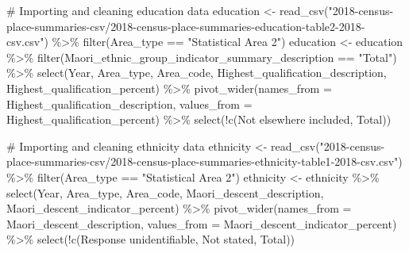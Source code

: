 \documentclass[
  letterpaper,
  DIV=11,
  numbers=noendperiod,
  oneside]{scrartcl}
\newenvironment{Shaded}{\begin{snugshade}}{\end{snugshade}}
\newcommand{\AttributeTok}[1]{\textcolor[rgb]{0.40,0.45,0.13}{#1}}
\newcommand{\CommentTok}[1]{\textcolor[rgb]{0.37,0.37,0.37}{#1}}
\newcommand{\FunctionTok}[1]{\textcolor[rgb]{0.28,0.35,0.67}{#1}}
\newcommand{\NormalTok}[1]{\textcolor[rgb]{0.00,0.23,0.31}{#1}}
\newcommand{\OtherTok}[1]{\textcolor[rgb]{0.00,0.23,0.31}{#1}}
\newcommand{\SpecialCharTok}[1]{\textcolor[rgb]{0.37,0.37,0.37}{#1}}
\newcommand{\StringTok}[1]{\textcolor[rgb]{0.13,0.47,0.30}{#1}}
\begin{document}
\begin{Shaded}
\begin{Highlighting}[]
\CommentTok{\# Importing and cleaning education data}
\NormalTok{education }\OtherTok{\textless{}{-}} \FunctionTok{read\_csv}\NormalTok{(}\StringTok{"2018{-}census{-}place{-}summaries{-}csv/2018{-}census{-}place{-}summaries{-}education{-}table2{-}2018{-}csv.csv"}\NormalTok{) }\SpecialCharTok{\%\textgreater{}\%}
  \FunctionTok{filter}\NormalTok{(Area\_type }\SpecialCharTok{==} \StringTok{"Statistical Area 2"}\NormalTok{)}
\NormalTok{education }\OtherTok{\textless{}{-}}\NormalTok{ education }\SpecialCharTok{\%\textgreater{}\%}
  \FunctionTok{filter}\NormalTok{(Maori\_ethnic\_group\_indicator\_summary\_description }\SpecialCharTok{==} \StringTok{"Total"}\NormalTok{) }\SpecialCharTok{\%\textgreater{}\%}
  \FunctionTok{select}\NormalTok{(Year, Area\_type, Area\_code, Highest\_qualification\_description, Highest\_qualification\_percent) }\SpecialCharTok{\%\textgreater{}\%}
  \FunctionTok{pivot\_wider}\NormalTok{(}\AttributeTok{names\_from =}\NormalTok{ Highest\_qualification\_description, }\AttributeTok{values\_from =}\NormalTok{ Highest\_qualification\_percent) }\SpecialCharTok{\%\textgreater{}\%}
  \FunctionTok{select}\NormalTok{(}\SpecialCharTok{!}\FunctionTok{c}\NormalTok{(}\StringTok{\textasciigrave{}}\AttributeTok{Not elsewhere included}\StringTok{\textasciigrave{}}\NormalTok{, Total))}

\CommentTok{\# Importing and cleaning ethnicity data}
\NormalTok{ethnicity }\OtherTok{\textless{}{-}} \FunctionTok{read\_csv}\NormalTok{(}\StringTok{"2018{-}census{-}place{-}summaries{-}csv/2018{-}census{-}place{-}summaries{-}ethnicity{-}table1{-}2018{-}csv.csv"}\NormalTok{) }\SpecialCharTok{\%\textgreater{}\%}
  \FunctionTok{filter}\NormalTok{(Area\_type }\SpecialCharTok{==} \StringTok{"Statistical Area 2"}\NormalTok{)}
\NormalTok{ethnicity }\OtherTok{\textless{}{-}}\NormalTok{ ethnicity }\SpecialCharTok{\%\textgreater{}\%}
  \FunctionTok{select}\NormalTok{(Year, Area\_type, Area\_code, Maori\_descent\_description, Maori\_descent\_indicator\_percent) }\SpecialCharTok{\%\textgreater{}\%}
  \FunctionTok{pivot\_wider}\NormalTok{(}\AttributeTok{names\_from =}\NormalTok{ Maori\_descent\_description, }\AttributeTok{values\_from =}\NormalTok{ Maori\_descent\_indicator\_percent) }\SpecialCharTok{\%\textgreater{}\%}
  \FunctionTok{select}\NormalTok{(}\SpecialCharTok{!}\FunctionTok{c}\NormalTok{(}\StringTok{\textasciigrave{}}\AttributeTok{Response unidentifiable}\StringTok{\textasciigrave{}}\NormalTok{, }\StringTok{\textasciigrave{}}\AttributeTok{Not stated}\StringTok{\textasciigrave{}}\NormalTok{, }\StringTok{\textasciigrave{}}\AttributeTok{Total}\StringTok{\textasciigrave{}}\NormalTok{))}


\end{Highlighting}
\end{Shaded}
\end{document}
